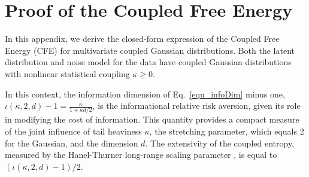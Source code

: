 \documentclass[twoside,11pt]{article}
\begin{document}
\section{Proof of the Coupled Free Energy}

In this appendix, we derive the closed-form expression of the Coupled Free Energy (CFE) for multivariate coupled Gaussian distributions. Both the latent distribution and noise model for the data have coupled Gaussian distributions with nonlinear statistical coupling $\kappa \geq 0.$

In this context, the information dimension of Eq.~\eqref{equ_infoDim} minus one, $\iota(\kappa,2,d)-1=\frac{\kappa}{1+\kappa d/2}$, is the informational relative risk aversion, given its role in modifying the cost of information. This quantity provides a compact measure of the joint influence of tail heaviness $\kappa$, the stretching parameter, which equals 2 for the Gaussian, and the dimension $d$. The extensivity of the coupled entropy, measured by the Hanel-Thurner long-range scaling parameter \citep{hanelComprehensiveClassificationComplex2011,nelsonUniqueUniversalEntropy2026}, is equal to $\left(\iota(\kappa,2,d)-1\right)/2$.
\end{document}

